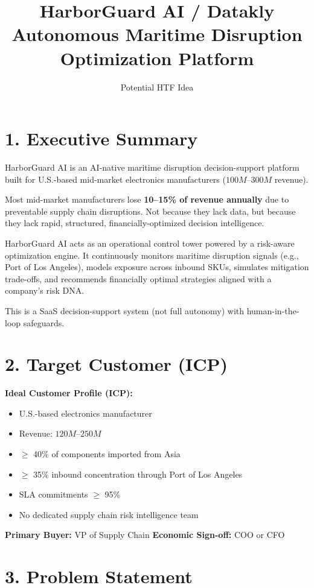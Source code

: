 \documentclass[11pt]{article}
\title{\textbf{HarborGuard AI / Datakly}\\
Autonomous Maritime Disruption Optimization Platform}
\author{Potential HTF Idea}
\date{}
\begin{document}
\maketitle

\section*{1. Executive Summary}

HarborGuard AI is an AI-native maritime disruption decision-support platform built for U.S.-based mid-market electronics manufacturers ($100M$--$300M$ revenue).

Most mid-market manufacturers lose \textbf{10--15\% of revenue annually} due to preventable supply chain disruptions. Not because they lack data, but because they lack rapid, structured, financially-optimized decision intelligence.

HarborGuard AI acts as an operational control tower powered by a risk-aware optimization engine. It continuously monitors maritime disruption signals (e.g., Port of Los Angeles), models exposure across inbound SKUs, simulates mitigation trade-offs, and recommends financially optimal strategies aligned with a company’s risk DNA.

This is a SaaS decision-support system (not full autonomy) with human-in-the-loop safeguards.

\section*{2. Target Customer (ICP)}

\textbf{Ideal Customer Profile (ICP):}

\begin{itemize}
    \item U.S.-based electronics manufacturer
    \item Revenue: $120M$--$250M$
    \item $\geq$ 40\% of components imported from Asia
    \item $\geq$ 35\% inbound concentration through Port of Los Angeles
    \item SLA commitments $\geq$ 95\%
    \item No dedicated supply chain risk intelligence team
\end{itemize}

\textbf{Primary Buyer:} VP of Supply Chain  
\textbf{Economic Sign-off:} COO or CFO  

\section*{3. Problem Statement}
\end{document}
